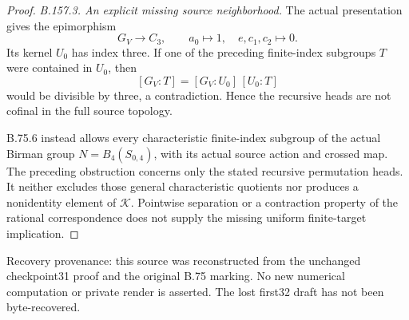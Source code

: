 \begin{proof}
\emph{B.157.3. An explicit missing source neighborhood.}
The actual presentation gives the epimorphism
\[
 G_V\longrightarrow C_3,\qquad
 a_0\longmapsto1,\quad e,c_1,c_2\longmapsto0.
\]
Its kernel \(U_0\) has index three. If one of the preceding
finite-index subgroups \(T\) were contained in \(U_0\), then
\[
 [G_V:T]=[G_V:U_0]\,[U_0:T]
\]
would be divisible by three, a contradiction. Hence the recursive
heads are not cofinal in the full source topology.

B.75.6 instead allows every characteristic finite-index subgroup
of the actual Birman group \(N=B_4(S_{0,4})\), with its actual
source action and crossed map. The preceding obstruction concerns
only the stated recursive permutation heads. It neither excludes
those general characteristic quotients nor produces a nonidentity
element of \(\mathcal K\). Pointwise separation or a contraction
property of the rational correspondence does not supply the
missing uniform finite-target implication.
\end{proof}

\noindent\footnotesize
Recovery provenance: this source was reconstructed from the unchanged
checkpoint31 proof
and the original B.75 marking. No new numerical computation or private
render is asserted. The lost first32 draft has not been byte-recovered.
\normalsize
